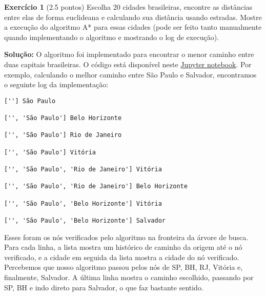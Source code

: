\noindent \textbf{Exercício 1} (2.5 pontos) Escolha 20 cidades brasileiras, encontre as distâncias
entre elas de forma euclideana e calculando sua distância usando estradas.
Mostre a execução do algoritmo A* para essas cidades (pode ser feito
tanto manualmente quando implementando o algoritmo e mostrando o
log de execução).

\bigskip

\noindent \textbf{Solução:} O algoritmo foi implementado para encontrar o menor caminho entre duas capitais brasileiras. O código está disponível neste \href{https://github.com/lucasresck/data-structures-algorithms/blob/main/notebooks/city_distances.ipynb}{Jupyter notebook}. Por exemplo, calculando o melhor caminho entre São Paulo e Salvador, encontramos o seguinte log da implementação:

\begin{verbatim}
[''] São Paulo

['', 'São Paulo'] Belo Horizonte

['', 'São Paulo'] Rio de Janeiro

['', 'São Paulo'] Vitória

['', 'São Paulo', 'Rio de Janeiro'] Vitória

['', 'São Paulo', 'Rio de Janeiro'] Belo Horizonte

['', 'São Paulo', 'Belo Horizonte'] Vitória

['', 'São Paulo', 'Belo Horizonte'] Salvador
\end{verbatim}

Esses foram os nós verificados pelo algoritmo na fronteira da árvore de busca. Para cada linha, a lista mostra um histórico de caminho da origem até o nó verificado, e a cidade em seguida da lista mostra a cidade do nó verificado. Percebemos que nosso algoritmo passou pelos nós de SP, BH, RJ, Vitória e, finalmente, Salvador. A última linha mostra o caminho escolhido, passando por SP, BH e indo direto para Salvador, o que faz bastante sentido.
